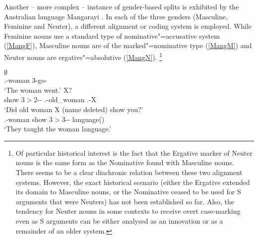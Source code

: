 Another -- more complex -- instance of gender-based splits is exhibited by the Australian language Mangarayi \citep{Merlan:1989}. 
In each of the three genders (Masculine, Feminine and Neuter), a different alignment or coding system is employed. 
While Feminine nouns use a standard type of nominative"=accusative system (\ref{MangF}), Masculine nouns are of the marked"=nominative type (\ref{MangM}) and Neuter nouns are ergative"=absolutive (\ref{MangN}).
\footnote{Of particular historical interest is the fact that the Ergative marker of Neuter nouns is the same form as the Nominative found with Masculine nouns.
 There seems to be a clear diachronic relation between these two alignment systems. 
However, the exact historical scenario (either the Ergative extended its domain to Masculine nouns, or the Nominative ceased to be used for S arguments that were Neuters) has not been established so far. 
Also, the tendency for Neuter nouns in some contexts to receive overt case-marking even as S
arguments can be either analysed as an innovation or as a remainder of an older system.}%
\enlargethispage{\baselineskip}

 \begin{exe} \ex\label{MangF}
 \begin{xlist} \ex\label{MangFS} \gll {} $\emptyset$\\
 \nom{}.\fem{}-woman 3\sg{}-go-\pstpunc{}\\
\glt `The woman went.'
  \ex\label{MangFA} \gll {}   X?\\
 show 3\sg{}$>$2\sg{}-\aux{}-\pstpunc{} \nom{}.\fem{}-old\_woman \nom{}.\fem{}-X\\
\glt `Did old woman X (name deleted) show you?'
  \ex\label{MangFP} \gll {}   \\
 \acc{}.\fem{}-woman show 3\pl{}$>$3\sg{}-\aux{}-\pstpunc{} language(\neu{})\\
\glt `They taught the woman language.'
 \end{xlist}
 \end{exe}


